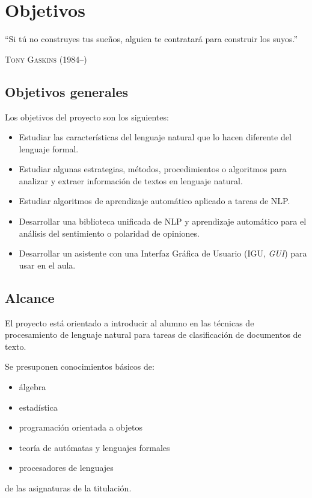 
\chapter{Objetivos}

\epigraph{``Si tú no construyes tus sueños, alguien te contratará para construir los suyos.''}{\textsc{Tony Gaskins} (1984--)}

\section{Objetivos generales}

Los objetivos del proyecto son los siguientes:

\begin{itemize}
\item Estudiar las características del lenguaje natural que lo hacen diferente del lenguaje formal.
\item Estudiar algunas estrategias, métodos, procedimientos o algoritmos para analizar y extraer información de textos en lenguaje natural.
\item Estudiar algoritmos de aprendizaje automático aplicado a tareas de NLP.
\item Desarrollar una biblioteca unificada de NLP y aprendizaje automático para el análisis del sentimiento o polaridad de opiniones.
\item Desarrollar un asistente con una Interfaz Gráfica de Usuario (IGU, \emph{GUI}) para usar en el aula.
\end{itemize}

\section{Alcance}

El proyecto está orientado a introducir al alumno en las técnicas de procesamiento de lenguaje natural para tareas de clasificación de documentos de texto.

Se presuponen conocimientos básicos de:
\begin{itemize}
\item álgebra
\item estadística
\item programación orientada a objetos
\item teoría de autómatas y lenguajes formales
\item procesadores de lenguajes
\end{itemize}
de las asignaturas de la titulación.

